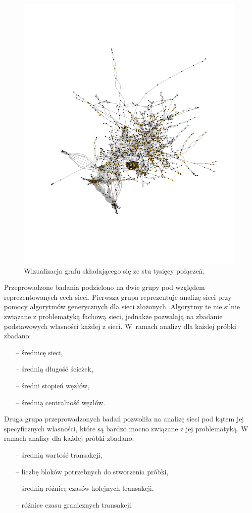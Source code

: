 \documentclass[12pt, twoside, final, openany]{mgr}
\begin{document}
\begin{figure}[H]
\begin{center}
\centering
\includegraphics[width=1\linewidth]{pictures/graph/graph.png}
\caption{Wizualizacja grafu składającego się ze stu tysięcy połączeń.}
\label{fig:graf}
\end{center}
\end{figure}

\newpage
\indent Przeprowadzone badania podzielono na dwie grupy pod względem reprezentowanych cech sieci. Pierwsza grupa reprezentuje analizę sieci przy pomocy algorytmów generycznych dla sieci złożonych. Algorytmy te nie silnie związane z problematyką fachową sieci, jednakże pozwalają na zbadanie podstawowych własności każdej z sieci. W~ramach analizy dla każdej próbki zbadano:
\begin{itemize}
\item[--] średnicę sieci,
\item[--] średnią długość ścieżek,
\item[--] średni stopień węzłów,
\item[--] średnią centralność węzłów.
\end{itemize}
Druga grupa przeprowadzonych badań pozwoliła na analizę sieci pod kątem jej specyficznych własności, które są bardzo mocno związane z jej problematyką. W ramach analizy dla każdej próbki zbadano:
\begin{itemize}
\item[--] średnią wartość transakcji,
\item[--] liczbę bloków potrzebnych do stworzenia próbki,
\item[--] średnią różnicę czasów kolejnych transakcji,
\item[--] różnice czasu granicznych transakcji.
\end{itemize}
\end{document}
